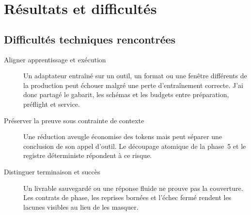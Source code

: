 \section{Résultats et difficultés}


\subsection{Difficultés techniques rencontrées}

\begin{description}
  \item[Aligner apprentissage et exécution] Un adaptateur entraîné sur un outil,
  un format ou une fenêtre différents de la production peut échouer malgré une
  perte d'entraînement correcte. J'ai donc partagé le gabarit, les schémas et les
  budgets entre préparation, préflight et service.

  \item[Préserver la preuve sous contrainte de contexte] Une réduction aveugle
  économise des tokens mais peut séparer une conclusion de son appel d'outil. Le
  découpage atomique de la phase~5 et le registre déterministe répondent à ce
  risque.


  \item[Distinguer terminaison et succès] Un livrable sauvegardé ou une réponse
  fluide ne prouve pas la couverture. Les contrats de phase, les reprises bornées
  et l'échec fermé rendent les lacunes visibles au lieu de les masquer.

\end{description}
